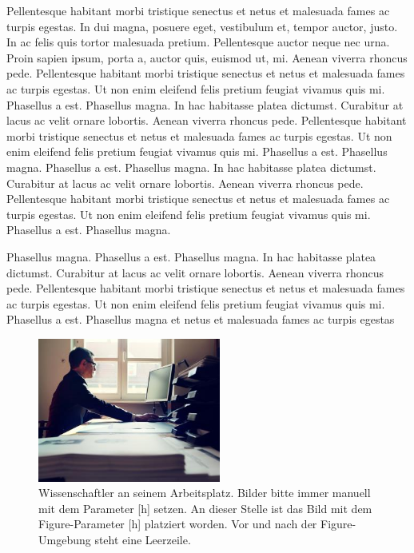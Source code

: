 Pellentesque habitant morbi tristique senectus et netus et malesuada fames ac turpis egestas. In dui magna, posuere eget, vestibulum et, tempor auctor, justo. In ac felis quis tortor malesuada pretium. Pellentesque auctor neque nec urna. Proin sapien ipsum, porta a, auctor quis, euismod ut, mi. Aenean viverra rhoncus pede. Pellentesque habitant morbi tristique senectus et netus et malesuada fames ac turpis egestas. Ut non enim eleifend felis pretium feugiat vivamus quis mi. Phasellus a est. Phasellus magna. In hac habitasse platea dictumst. Curabitur at lacus ac velit ornare lobortis. Aenean viverra rhoncus pede. Pellentesque habitant morbi tristique senectus et netus et malesuada fames ac turpis egestas. Ut non enim eleifend felis pretium feugiat vivamus quis mi. Phasellus a est. Phasellus magna. Phasellus a est. Phasellus magna. In hac habitasse platea dictumst. Curabitur at lacus ac velit ornare lobortis. Aenean viverra rhoncus pede. Pellentesque habitant morbi tristique senectus et netus et malesuada fames ac turpis egestas. Ut non enim eleifend felis pretium feugiat vivamus quis mi. Phasellus a est. Phasellus magna.

Phasellus magna. Phasellus a est. Phasellus magna. In hac habitasse platea dictumst. Curabitur at lacus ac velit ornare lobortis. Aenean viverra rhoncus pede. Pellentesque habitant morbi tristique senectus et netus et malesuada fames ac turpis egestas. Ut non enim eleifend felis pretium feugiat vivamus quis mi. Phasellus a est. Phasellus magna et netus et malesuada fames ac turpis egestas

\begin{figure}[h]
	\centering
	\includegraphics[width=6cm]{Abbildungen/wissen.jpg}
	\caption[Wissenschaftler an seinem Arbeitsplatz.]{Wissenschaftler an seinem Arbeitsplatz. Bilder bitte immer manuell mit dem Parameter [h] setzen. An dieser Stelle ist das Bild mit dem Figure-Parameter [h] platziert worden. Vor und nach der Figure-Umgebung steht eine Leerzeile.}
	\label{fig:wissen}
\end{figure}

